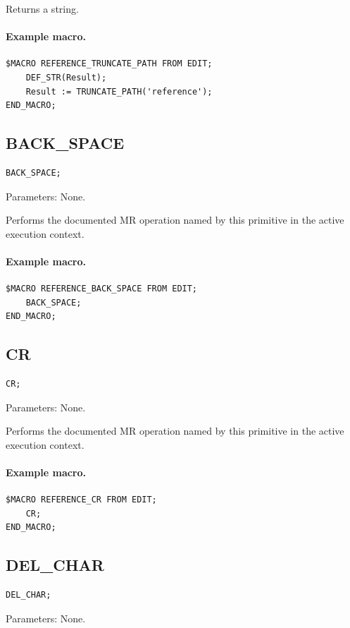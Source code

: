 \documentclass[a4paper,10pt,twoside,openany]{book}
\begin{document}
Returns a string.

\paragraph{Example macro.}
\begin{verbatim}
$MACRO REFERENCE_TRUNCATE_PATH FROM EDIT;
    DEF_STR(Result);
    Result := TRUNCATE_PATH('reference');
END_MACRO;
\end{verbatim}

\label{prim:procedure-back-space}
\subsection*{BACK\_SPACE}
\begin{verbatim}
BACK_SPACE;
\end{verbatim}
Parameters: None.

Performs the documented MR operation named by this primitive in the active execution context.

\paragraph{Example macro.}
\begin{verbatim}
$MACRO REFERENCE_BACK_SPACE FROM EDIT;
    BACK_SPACE;
END_MACRO;
\end{verbatim}

\label{prim:procedure-cr}
\subsection*{CR}
\begin{verbatim}
CR;
\end{verbatim}
Parameters: None.

Performs the documented MR operation named by this primitive in the active execution context.

\paragraph{Example macro.}
\begin{verbatim}
$MACRO REFERENCE_CR FROM EDIT;
    CR;
END_MACRO;
\end{verbatim}

\label{prim:procedure-del-char}
\subsection*{DEL\_CHAR}
\begin{verbatim}
DEL_CHAR;
\end{verbatim}
Parameters: None.
\end{document}
